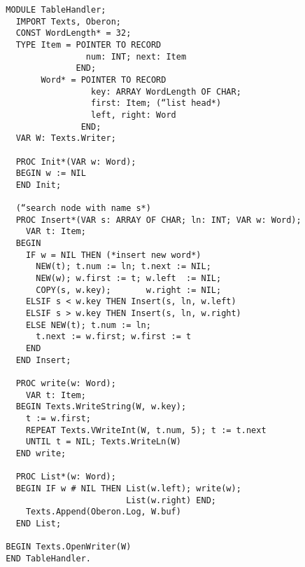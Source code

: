 \begin{verbatim}
  MODULE TableHandler;
    IMPORT Texts, Oberon;
    CONST WordLength* = 32;
    TYPE Item = POINTER TO RECORD
                  num: INT; next: Item
                END;
         Word* = POINTER TO RECORD
                   key: ARRAY WordLength OF CHAR;
                   first: Item; (“list head*)
                   left, right: Word
                 END;
    VAR W: Texts.Writer;
 
    PROC Init*(VAR w: Word);
    BEGIN w := NIL
    END Init;
 
    (“search node with name s*)
    PROC Insert*(VAR s: ARRAY OF CHAR; ln: INT; VAR w: Word);
      VAR t: Item;
    BEGIN
      IF w = NIL THEN (*insert new word*)
        NEW(t); t.num := ln; t.next := NIL;
        NEW(w); w.first := t; w.left  := NIL;
        COPY(s, w.key);       w.right := NIL;
      ELSIF s < w.key THEN Insert(s, ln, w.left)
      ELSIF s > w.key THEN Insert(s, ln, w.right)
      ELSE NEW(t); t.num := ln;
        t.next := w.first; w.first := t
      END
    END Insert;
 
    PROC write(w: Word);
      VAR t: Item;
    BEGIN Texts.WriteString(W, w.key);
      t := w.first;
      REPEAT Texts.VWriteInt(W, t.num, 5); t := t.next
      UNTIL t = NIL; Texts.WriteLn(W)
    END write;
 
    PROC List*(w: Word);
    BEGIN IF w # NIL THEN List(w.left); write(w);
                          List(w.right) END;
      Texts.Append(Oberon.Log, W.buf)
    END List;
 
  BEGIN Texts.OpenWriter(W)
  END TableHandler.
\end{verbatim}
